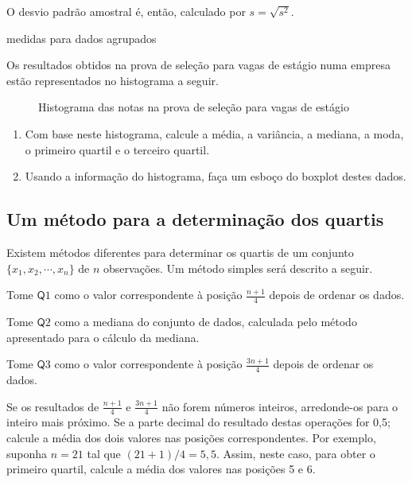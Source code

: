 O desvio padrão amostral é, então, calculado por \(s=\sqrt{s^2}\).
\label{\detokenize{PE104-A:ativ-dadosagrupados}}
\begin{task}{ medidas para dados agrupados}

Os resultados obtidos na prova de seleção para vagas de estágio numa empresa estão representados no histograma a seguir.
\label{\detokenize{PE104-A:fig-hist-vagas-estagio}}
\begin{figure}[H]
\centering

\noindent{}
\caption{Histograma das notas na prova de seleção para vagas de estágio}
\label{\detokenize{PE104-A:fig-hist-vagas-estagio}}\end{figure}

\begin{enumerate}
\item {} 
Com base neste histograma, calcule a média, a variância, a mediana, a moda, o primeiro quartil e o terceiro quartil.

\item {} 
Usando a informação do histograma, faça um esboço do boxplot destes dados.

\end{enumerate}
\end{task}



\subsection{Um método para a determinação dos quartis}

Existem métodos diferentes para determinar os quartis de um conjunto \(\{x_1,x_2,\cdots,x_n\}\) de \(n\) observações. Um método simples será descrito a seguir.

Tome \(\textsf{Q}1\) como o valor correspondente à posição \(\frac{n+1}{4}\) depois de ordenar os dados.

Tome \(\textsf{Q}2\) como a mediana do conjunto de dados, calculada pelo método apresentado para o cálculo da mediana.

Tome \(\textsf{Q}3\) como o valor correspondente à posição \(\frac{3n+1}{4}\) depois de ordenar os dados.

Se os resultados de  \(\frac{n+1}{4}\) e \(\frac{3n+1}{4}\) não forem números inteiros, arredonde-os para o inteiro mais próximo. Se a parte decimal do resultado destas operações for 0,5; calcule a média dos dois valores nas posições correspondentes. Por exemplo, suponha \(n=21\) tal que \((21+1)/4=5,5\). Assim, neste caso, para obter o primeiro quartil, calcule a média dos valores nas posições 5 e 6.


